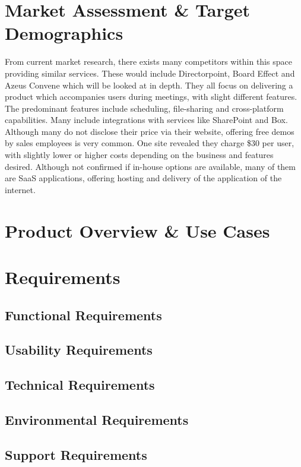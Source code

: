 \documentclass[11pt, oneside]{article}
\begin{document}
\section{Market Assessment \& Target Demographics}
From current market research, there exists many competitors within this space providing similar services.  These would include Directorpoint, Board Effect and Azeus Convene which will be looked at in depth. They all focus on delivering a product which accompanies users during meetings, with slight different features. The predominant features include scheduling, file-sharing and cross-platform capabilities. Many include integrations with services like SharePoint and Box. Although many do not disclose their price via their website, offering free demos by sales employees is very common. One site revealed they charge \$30 per user, with slightly lower or higher costs depending on the business and features desired. Although not confirmed if in-house options are available, many of them are SaaS applications, offering hosting and delivery of the application of the internet. 
\section{Product Overview \& Use Cases}


\section{Requirements}
\subsection{Functional Requirements}
\subsection{Usability Requirements}
\subsection{Technical Requirements}
\subsection{Environmental Requirements}
\subsection{Support Requirements}
\end{document}
